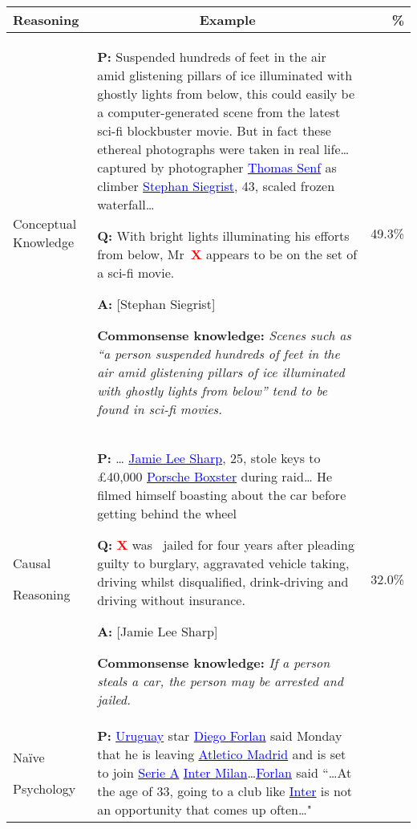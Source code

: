 \begin{table*}[!t]
\centering
\small
\begin{tabular}{@{}m{2cm}m{12cm}r@{}}
\toprule
\multicolumn{1}{l}{Reasoning} & \multicolumn{1}{c}{Example} & \multicolumn{1}{r}{\%} \\ \midrule
Conceptual Knowledge  &    
\noindent\textbf{P:} Suspended hundreds of feet in the air amid glistening pillars of ice illuminated with ghostly lights from below, this could easily be a computer-generated scene from the latest sci-fi blockbuster movie. But in fact these ethereal photographs were taken in real life\ldots
captured by photographer \underline{\textcolor{blue}{Thomas Senf}} as climber \underline{\textcolor{blue}{Stephan Siegrist}}, 43, scaled frozen waterfall\ldots

\noindent\textbf{Q:} With bright lights illuminating his efforts from below, Mr \textcolor{red}{$\mathbf{X}$} appears to be on the set of a sci-fi movie.

\noindent\textbf{A:} [Stephan Siegrist]

\noindent\textbf{Commonsense knowledge:} \emph{Scenes such as ``a person suspended hundreds of feet in the air amid glistening pillars of ice illuminated with ghostly lights from below'' tend to be found in sci-fi movies.}
& 49.3\%                            \\ \midrule
Causal 

Reasoning   &     
\noindent\textbf{P:} \ldots
\underline{\textcolor{blue}{Jamie Lee Sharp}}, 25, stole keys to \pounds 40,000 \underline{\textcolor{blue}{Porsche Boxster}} during raid\ldots
He filmed himself boasting about the car before getting behind the wheel

\noindent\textbf{Q:} \textcolor{red}{$\mathbf{X}$} was  jailed for four years after pleading guilty to burglary, aggravated vehicle taking, driving whilst disqualified, drink-driving and driving without insurance.

\noindent\textbf{A:} [Jamie Lee Sharp]

\noindent\textbf{Commonsense knowledge:} \emph{If a person steals a car, the person may be arrested and jailed.}
& 32.0\%                           \\ \midrule
Na\"ive 

Psychology &      
\noindent\textbf{P:} \underline{\textcolor{blue}{Uruguay}} star \underline{\textcolor{blue}{Diego Forlan}} said Monday that he is leaving \underline{\textcolor{blue}{Atletico Madrid}} and is set to join \underline{\textcolor{blue}{Serie A}} \underline{\textcolor{blue}{Inter Milan}}\ldots \underline{\textcolor{blue}{Forlan}} said ``\ldots At the age of 33, going to a club like \underline{\textcolor{blue}{Inter}} is not an opportunity that comes up often\ldots"


\end{tabular}
\end{table*}

